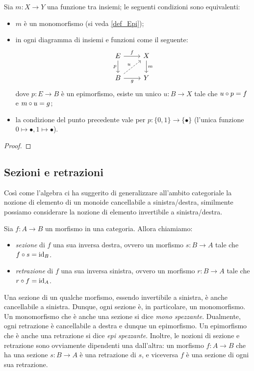 \begin{proposition}
	Sia \(m : X\to Y\) una funzione tra insiemi; le seguenti condizioni sono equivalenti:
	\begin{itemize}
		\item \(m\) è un monomorfismo (si veda \ref{def_Epi});
		\item in ogni diagramma di insiemi e funzioni come il seguente:
		      \[\begin{tikzcd}
				      E \ar[r, "f"]\ar[d, "p"']& X \ar[d, "m"]\\
				      B \ar[r, "g"'] \ar[ur, dashed, "u"]& Y
			      \end{tikzcd}\]
		      dove \(p : E\to B\) è un epimorfismo, esiste un unico \(u : B\to X\) tale che \(u\circ p = f\) e \(m\circ u = g\);
		\item la condizione del punto precedente vale per \(p : \{0,1\} \to \{\bullet\}\) (l'unica funzione \(0\mapsto\bullet, 1\mapsto\bullet\)).
	\end{itemize}
\end{proposition}
\begin{proof}
	\Todo{}
\end{proof}

\subsection{Sezioni e retrazioni}\label{sec_sezretraz}
Così come l'algebra ci ha suggerito di generalizzare all'ambito categoriale la nozione di elemento di un monoide cancellabile a sinistra/destra,
similmente possiamo considerare la nozione di elemento invertibile a sinistra/destra.

\begin{definition}
	Sia \(f \colon A \to B\) un morfismo in una categoria.
	Allora chiamiamo:
	\begin{itemize}
		\item \emph{sezione} di \(f\) una sua inversa destra, ovvero un morfismo \(s \colon B \to A\) tale che \(f \circ s = \mathrm{id}_{B}\).
		\item \emph{retrazione} di \(f\) una sua inversa sinistra, ovvero un morfismo \(r \colon B \to A\) tale che \(r \circ f = \mathrm{id}_{A}\).
	\end{itemize}
\end{definition}
\begin{remark}
	Una sezione di un qualche morfismo, essendo invertibile a sinistra, è anche cancellabile a sinistra.
	Dunque, ogni sezione è, in particolare, un monomorfismo.
	Un monomorfismo che è anche una sezione si dice \emph{mono spezzante}.
	Dualmente, ogni retrazione è cancellabile a destra e dunque un epimorfismo.
	Un epimorfismo che è anche una retrazione si dice \emph{epi spezzante}.
	Inoltre, le nozioni di sezione e retrazione sono ovviamente dipendenti una dall'altra:
	un morfismo \(f : A \to B\) che ha una sezione \(s : B\to A\) è una retrazione di \(s\),
	e viceversa \(f\) è una sezione di ogni sua retrazione.
\end{remark}

